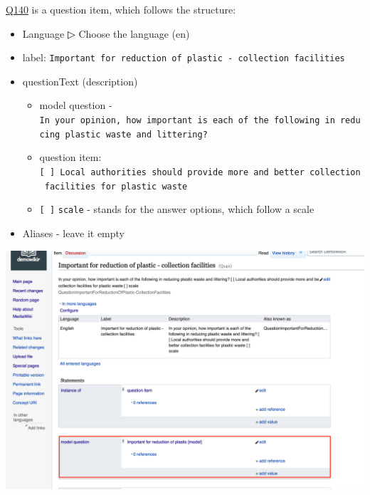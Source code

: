 \documentclass[
  letterpaper,
  DIV=11,
  numbers=noendperiod]{scrreprt}
\providecommand{\tightlist}{%
  \setlength{\itemsep}{0pt}\setlength{\parskip}{0pt}}\usepackage{longtable,booktabs,array}
\begin{document}
\href{https://reprexbase.eu/demowiki/index.php?title=Item:Q140}{Q140} is
a question item, which follows the structure:

\begin{itemize}
\tightlist
\item
  Language ▷ Choose the language (en)
\item
  label:
  \texttt{Important\ for\ reduction\ of\ plastic\ -\ collection\ facilities}
\item
  questionText (description)

  \begin{itemize}
  \tightlist
  \item
    model question -
    \texttt{In\ your\ opinion,\ how\ important\ is\ each\ of\ the\ following\ in\ reducing\ plastic\ waste\ and\ littering?}
  \item
    question item:
    \texttt{{[}\ {]}\ Local\ authorities\ should\ provide\ more\ and\ better\ collection\ facilities\ for\ plastic\ waste}
  \item
    \texttt{{[}\ {]}} \texttt{scale} - stands for the answer options,
    which follow a scale
  \end{itemize}
\item
  Aliases - leave it empty
\end{itemize}

\begin{tcolorbox}[enhanced jigsaw, opacityback=0, bottomrule=.15mm, rightrule=.15mm, toptitle=1mm, breakable, colbacktitle=quarto-callout-note-color!10!white, colback=white, title=\textcolor{quarto-callout-note-color}{\faInfo}\hspace{0.5em}{When creating a ``question item'', using statements, always connect the
``question item'' to the ``model question''}, leftrule=.75mm, toprule=.15mm, left=2mm, arc=.35mm, colframe=quarto-callout-note-color-frame, coltitle=black, titlerule=0mm, bottomtitle=1mm, opacitybacktitle=0.6]

\end{tcolorbox}

\begin{center}
\includegraphics{png/question_to_wikibase/modelQuestion_questionItem_6x4.png}
\end{center}
\end{document}
